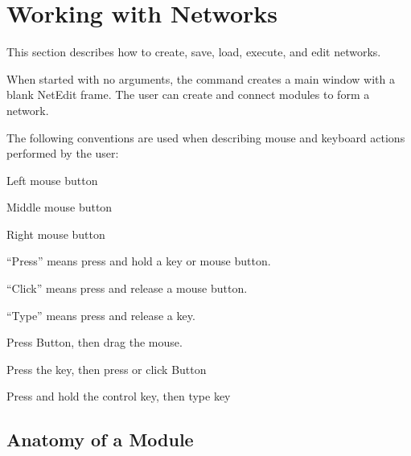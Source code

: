 %
%
%
%
%

\chapter{Working with Networks}
\label{ch:workwithnets}

This section describes how to create, save, load, execute, and edit
networks.

When started with no arguments, the  command creates a
main window with a blank NetEdit frame. The user can create and
connect modules to form a network.

The following conventions are used when describing mouse and keyboard
actions performed by the user:

\begin{description}
 Left mouse button

 Middle mouse button

 Right mouse button

 ``Press'' means press and hold a key or mouse button.

 ``Click'' means press and release a mouse button.

 ``Type''  means press and release a key.

 Press Button,
then drag the mouse.

 Press the  key,
then press or click Button

 Press and hold the control key, then
type key 
\end{description}


\section{Anatomy of a Module}
\label{sec:modanatomy}

